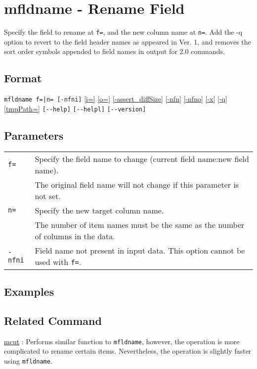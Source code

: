 
%

\section{mfldname - Rename Field\label{sect:mfldname}}
Specify the field to rename at \verb|f=|, and the new column name at \verb|n=|. Add the -q option to revert to the field header names as appeared in  Ver. 1, and removes the sort order symbols appended to field names in output for  2.0 commands. 

\subsection*{Format}
\verb/mfldname f=|n= [-nfni]/
\hyperref[sect:option_i]{[i=]}
\hyperref[sect:option_o]{[o=]}
\hyperref[sect:option_assert_diffSize]{[-assert\_diffSize]}
\hyperref[sect:option_nfn]{[-nfn]}
\hyperref[sect:option_nfno]{[-nfno]}
\hyperref[sect:option_x]{[-x]}
\hyperref[sect:option_q]{[-q]}
\hyperref[sect:option_option_tmppath]{[tmpPath=]}
\verb|[--help]|
\verb|[--helpl]|
\verb|[--version]|\\

\subsection*{Parameters}
\begin{table}[htbp]
{\small
\begin{tabular}{ll}
\verb|f=|    & Specify the field name to change (current field name:new field name). \\
             & The original field name will not change if this parameter is not set. \\
\verb|n=|    & Specify the new target column name. \\
             & The number of item names must be the same as the number of columns in the data. \\
\verb|-nfni| & Field name not present in input data. This option cannot be used with \verb|f=|. \\
\end{tabular} 
}
\end{table} 

\subsection*{Examples}

\subsection*{Related Command}
\hyperref[sect:mcut]{mcut} : Performs similar function to \verb|mfldname|, however, the operation is more complicated to rename certain items. Nevertheless, the operation is slightly faster using \verb|mfldname|. 

%
